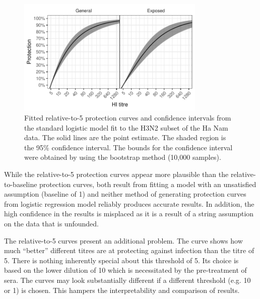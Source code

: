\begin{figure}[htp]
    \centering
    \includegraphics[width=0.8\textwidth]{../fit-logistic-boot-plot/hanam-h3-prot-rel.pdf}
    \caption{
        Fitted relative-to-5 protection curves and confidence intervals from the standard logistic model fit to the H3N2 subset of the Ha Nam data. The solid lines are the point estimate. The shaded region is the 95\% confidence interval. The bounds for the confidence interval were obtained by using the bootstrap method (10,000 samples).
    }
    \label{fig:hanam-prot-rel-lr-boot}
\end{figure}

While the relative-to-5 protection curves appear more plausible than the relative-to-baseline protection curves, both result from fitting a model with an unsatisfied assumption (baseline of 1) and neither method of generating protection curves from logistic regression model reliably produces accurate results. In addition, the high confidence in the results is misplaced as it is a result of a string assumption on the data that is unfounded.

The relative-to-5 curves present an additional problem. The curve shows how much ``better'' different titres are at protecting against infection than the titre of 5.
There is nothing inherently special about this threshold of 5. Its choice is based on the lower dilution of 10 which is necessitated by the pre-treatment of sera. The curves may look substantially different if a different threshold (e.g. 10 or 1) is chosen. This hampers the interpretability and comparison of results.

